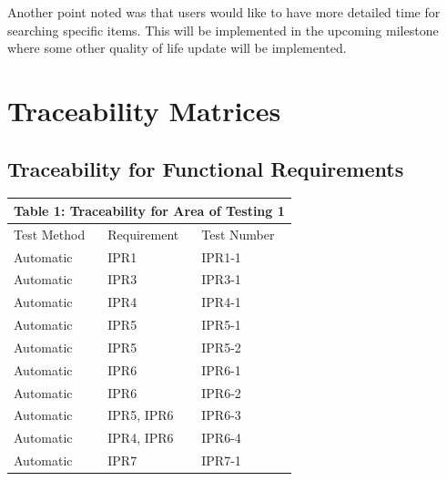 \documentclass[12pt, titlepage]{article}
\begin{document}
 Another point noted was that users would like to have more detailed time for searching specific items. This will be implemented in the upcoming milestone where some other quality of life update will be implemented. \\

\section{Traceability Matrices}
\subsection{Traceability for Functional Requirements}
\begin{tabular}{|p{}|p{}|p{}|}

\hline \multicolumn{3}{|c|}{Table 1: Traceability for Area of Testing 1}\\

\hline Test Method&Requirement&Test Number\\

\hline Automatic&IPR1&IPR1-1\\

\hline Automatic&IPR3&IPR3-1\\

\hline Automatic&IPR4&IPR4-1\\

\hline Automatic&IPR5&IPR5-1\\

\hline Automatic&IPR5&IPR5-2\\

\hline Automatic&IPR6&IPR6-1\\

\hline Automatic&IPR6&IPR6-2\\

\hline Automatic&IPR5, IPR6&IPR6-3\\

\hline Automatic&IPR4, IPR6&IPR6-4\\

\hline Automatic&IPR7&IPR7-1\\

\hline

\end{tabular}
\\
\end{document}
